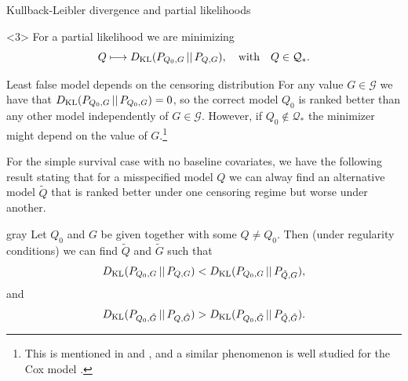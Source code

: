 \documentclass[smaller]{beamer}\usepackage{listings}
\begin{document}
\begin{frame}[label={sec:org2a57d04}]{Kullback-Leibler divergence and partial likelihoods}
\begin{onlyenv}<3>
For a partial likelihood we are minimizing
\begin{equation*}
  Q \longmapsto D_{\mathrm{KL}}(P_{Q_0,G} \, || \, P_{Q,G}),
  \quad \text{with} \quad Q \in \mathcal{Q}_*.
\end{equation*}

\vfill

\end{onlyenv}
\end{frame}

\begin{frame}[label={sec:orgfbb4188}]{Least false model depends on the censoring distribution}
\small For any value \(G \in \mathcal{G}\) we have that \(D_{\mathrm{KL}}(P_{Q_0,G} \, || \, P_{Q_0,G}) = 0\), so
the correct model \(Q_0\) is ranked better than any other model independently of \(G \in \mathcal{G}\).
However, if \(Q_0 \not \in \mathcal{Q}_*\) the minimizer might depend on the value of \(G\).\footnote{This is mentioned in \cite{whitney2019comment} and \cite{van2003unicv}, and a similar
phenomenon is well studied for the Cox model
\citep{struthers1986misspecified,hjort1992inference,fine2002comparing}.}

\vfill \pause

For the simple survival case with no baseline covariates, we have the following result stating that
for a misspecified model \(Q\) we can alway find an alternative model \(\tilde Q\) that is ranked
better under one censoring regime but worse under another.

\vfill


\begin{beamercolorbox}[rounded=true]{gray}
Let $Q_0$ and $G$ be given together with some $Q \not = Q_0$. Then (under
regularity conditions) we can find $\tilde Q$ and $\tilde G$ such
that
\begin{equation*}
  D_{\mathrm{KL}}(P_{Q_0, G} \, || \, P_{Q, G}) < D_{\mathrm{KL}}(P_{Q_0, G} \, || \, P_{\tilde Q, G}),
\end{equation*}
and
\begin{equation*}
  D_{\mathrm{KL}}(P_{Q_0, \tilde G} \, || \, P_{Q, \tilde G}) > D_{\mathrm{KL}}(P_{Q_0, \tilde G} \, || \, P_{\tilde Q,
    \tilde G}).
\end{equation*}
\end{beamercolorbox}
\end{frame}
\end{document}
